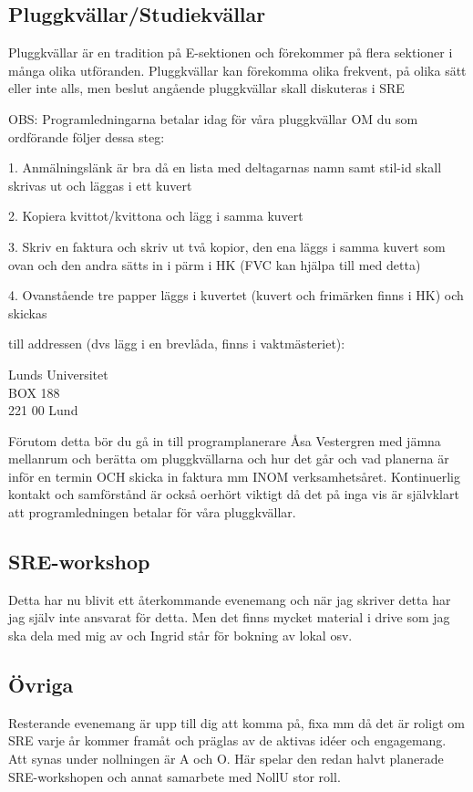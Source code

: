 \documentclass[10pt]{article}
\begin{document}
\subsection{Pluggkvällar/Studiekvällar}
Pluggkvällar är en tradition på E-sektionen och förekommer på flera sektioner i många
olika utföranden. Pluggkvällar kan förekomma olika frekvent, på olika sätt eller inte alls,
men beslut angående pluggkvällar skall diskuteras i SRE

OBS: Programledningarna betalar idag för våra pluggkvällar OM du som ordförande följer dessa steg:

1. Anmälningslänk är bra då en lista med deltagarnas namn samt stil-id skall skrivas ut och läggas i ett kuvert

2. Kopiera kvittot/kvittona och lägg i samma kuvert

3. Skriv en faktura och skriv ut två kopior, den ena läggs i samma kuvert som ovan och den andra sätts in i pärm i HK (FVC kan hjälpa till med detta)

4. Ovanstående tre papper läggs i kuvertet (kuvert och frimärken finns i HK) och skickas

till addressen (dvs lägg i en brevlåda, finns i vaktmästeriet):

Lunds Universitet\\
BOX 188\\
221 00 Lund

Förutom detta bör du gå in till programplanerare Åsa Vestergren med jämna mellanrum
och berätta om pluggkvällarna och hur det går och vad planerna är inför en termin OCH
skicka in faktura mm INOM verksamhetsåret. Kontinuerlig kontakt och samförstånd är
också oerhört viktigt då det på inga vis är självklart att programledningen betalar för
våra pluggkvällar.

\subsection{SRE-workshop}
Detta har nu blivit ett återkommande evenemang och när jag skriver detta har jag själv inte ansvarat för detta. Men det finns mycket material i drive som jag ska dela med mig av och Ingrid står för bokning av lokal osv.

\subsection{Övriga}
Resterande evenemang är upp till dig att komma på, fixa mm då det är roligt om
SRE varje år kommer framåt och präglas av de aktivas idéer och engagemang. Att
synas under nollningen är A och O. Här spelar den redan halvt planerade SRE-workshopen och annat samarbete med NollU stor roll.
\end{document}
